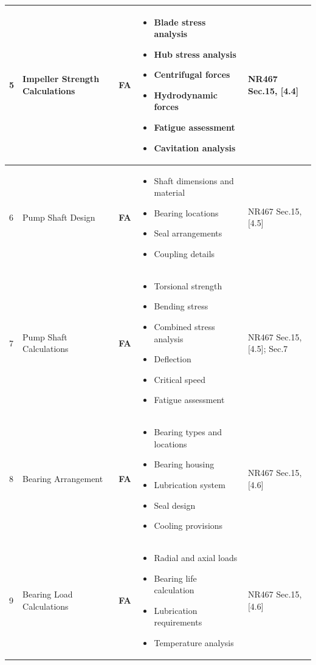 \documentclass[11pt,a4paper]{report}
\newcommand{\fa}{\textbf{\textcolor{warningred}{FA}}}
\begin{document}
\begin{longtable}{|p{0.5cm}|p{5cm}|p{1.5cm}|p{5.5cm}|p{2cm}|}
5 & Impeller Strength Calculations & \fa{} & 
\begin{itemize}[leftmargin=*,nosep]
\item Blade stress analysis
\item Hub stress analysis
\item Centrifugal forces
\item Hydrodynamic forces
\item Fatigue assessment
\item Cavitation analysis
\end{itemize} & NR467 Sec.15, [4.4] \\
\hline

6 & Pump Shaft Design & \fa{} & 
\begin{itemize}[leftmargin=*,nosep]
\item Shaft dimensions and material
\item Bearing locations
\item Seal arrangements
\item Coupling details
\end{itemize} & NR467 Sec.15, [4.5] \\
\hline

7 & Pump Shaft Calculations & \fa{} & 
\begin{itemize}[leftmargin=*,nosep]
\item Torsional strength
\item Bending stress
\item Combined stress analysis
\item Deflection
\item Critical speed
\item Fatigue assessment
\end{itemize} & NR467 Sec.15, [4.5]; Sec.7 \\
\hline

8 & Bearing Arrangement & \fa{} & 
\begin{itemize}[leftmargin=*,nosep]
\item Bearing types and locations
\item Bearing housing
\item Lubrication system
\item Seal design
\item Cooling provisions
\end{itemize} & NR467 Sec.15, [4.6] \\
\hline

9 & Bearing Load Calculations & \fa{} & 
\begin{itemize}[leftmargin=*,nosep]
\item Radial and axial loads
\item Bearing life calculation
\item Lubrication requirements
\item Temperature analysis
\end{itemize} & NR467 Sec.15, [4.6] \\
\hline

\end{longtable}
\end{document}
